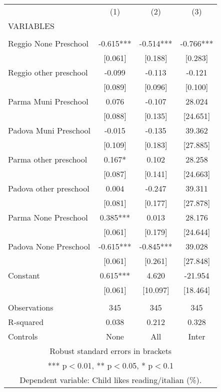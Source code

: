 \begin{tabular}{lccc} \hline
 & (1) & (2) & (3) \\
VARIABLES &  &  &  \\ \hline
 &  &  &  \\
Reggio None Preschool & -0.615*** & -0.514*** & -0.766*** \\
 & [0.061] & [0.188] & [0.283] \\
Reggio other preschool & -0.099 & -0.113 & -0.121 \\
 & [0.089] & [0.096] & [0.100] \\
Parma Muni Preschool & 0.076 & -0.107 & 28.024 \\
 & [0.088] & [0.135] & [24.651] \\
Padova Muni Preschool & -0.015 & -0.135 & 39.362 \\
 & [0.109] & [0.183] & [27.885] \\
Parma other preschool & 0.167* & 0.102 & 28.258 \\
 & [0.087] & [0.141] & [24.663] \\
Padova other preschool & 0.004 & -0.247 & 39.311 \\
 & [0.081] & [0.177] & [27.878] \\
Parma None Preschool & 0.385*** & 0.013 & 28.176 \\
 & [0.061] & [0.179] & [24.644] \\
Padova None Preschool & -0.615*** & -0.845*** & 39.028 \\
 & [0.061] & [0.261] & [27.848] \\
Constant & 0.615*** & 4.620 & -21.954 \\
 & [0.061] & [10.097] & [18.464] \\
 &  &  &  \\
Observations & 345 & 345 & 345 \\
R-squared & 0.038 & 0.212 & 0.328 \\
 Controls & None & All & Inter \\ \hline
\multicolumn{4}{c}{ Robust standard errors in brackets} \\
\multicolumn{4}{c}{ *** p$<$0.01, ** p$<$0.05, * p$<$0.1} \\
\multicolumn{4}{c}{ Dependent variable: Child likes reading/italian (\%).} \\
\end{tabular}
